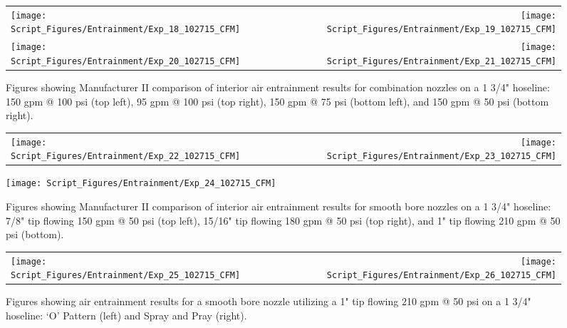 \documentclass[12pt,oneside]{book}
\begin{document}
\clearpage

\begin{figure}[!ht]
\begin{tabular*}{\textwidth}{lr}
\texttt{[image: Script\_Figures/Entrainment/Exp\_18\_102715\_CFM]} &
\texttt{[image: Script\_Figures/Entrainment/Exp\_19\_102715\_CFM]} \\
\texttt{[image: Script\_Figures/Entrainment/Exp\_20\_102715\_CFM]} &
\texttt{[image: Script\_Figures/Entrainment/Exp\_21\_102715\_CFM]} \\
\end{tabular*}
\caption{Figures showing Manufacturer II comparison of interior air entrainment results for combination nozzles on a 1 3/4" hoseline: 150 gpm @ 100 psi (top left), 95 gpm @ 100 psi (top right), 150 gpm @ 75 psi (bottom left), and 150 gpm @ 50 psi (bottom right).}
\label{fig:1_5_Interior_Combination_Manufacturer_II}
\end{figure}

\clearpage

\begin{figure}[!ht]
\begin{tabular*}{\textwidth}{lr}
\texttt{[image: Script\_Figures/Entrainment/Exp\_22\_102715\_CFM]} &
\texttt{[image: Script\_Figures/Entrainment/Exp\_23\_102715\_CFM]} \\
\end{tabular*}
\centering
\texttt{[image: Script\_Figures/Entrainment/Exp\_24\_102715\_CFM]} 
\caption{Figures showing Manufacturer II comparison of interior air entrainment results for smooth bore nozzles on a 1 3/4" hoseline: 7/8" tip flowing 150 gpm @ 50 psi (top left), 15/16" tip flowing 180 gpm @ 50 psi (top right), and 1" tip flowing 210 gpm @ 50 psi (bottom).}
\label{fig:1_5_Interior_Smooth_Bore_Manufacturer_II}
\end{figure}

\clearpage

\begin{figure}[!ht]
\begin{tabular*}{\textwidth}{lr}
\texttt{[image: Script\_Figures/Entrainment/Exp\_25\_102715\_CFM]} &
\texttt{[image: Script\_Figures/Entrainment/Exp\_26\_102715\_CFM]} \\
\end{tabular*}
\caption{Figures showing air entrainment results for a smooth bore nozzle utilizing a 1" tip flowing 210 gpm @ 50 psi on a 1 3/4" hoseline: `O' Pattern (left) and Spray and Pray (right).}
\label{fig:Nozzle_Movement}
\end{figure}
\end{document}
